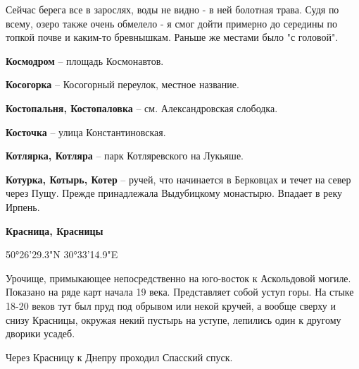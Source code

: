 Сейчас берега все в зарослях, воды не видно - в ней болотная трава. Судя по всему, озеро также очень обмелело - я смог дойти примерно до середины по топкой почве и каким-то бревнышкам. Раньше же местами было "с головой".\\

\medskip

\textbf{Космодром} – площадь Космонавтов.\\

\medskip

\textbf{Косогорка} – Косогорный переулок, местное название.\\

\medskip

\textbf{Костопальня, Костопаловка} – см.  Александровская слободка.\\

\medskip

\textbf{Косточка} – улица Константиновская.\\

\medskip



\textbf{Котлярка, Котляра} – парк Котляревского на Лукьяше.\\

\medskip

\textbf{Котурка, Котырь, Котер} – ручей, что начинается в Берковцах и течет на север через Пущу. Прежде принадлежала Выдубицкому монастырю. Впадает в реку Ирпень.\\

\medskip

\textbf{Красница, Красницы} 

50°26'29.3"N 30°33'14.9"E

Урочище, примыкающее непосредственно на юго-восток к Аскольдовой могиле. Показано на ряде карт начала 19 века. Представляет собой уступ горы. На стыке 18-20 веков тут был пруд под обрывом или некой кручей, а вообще сверху и снизу Красницы, окружая некий пустырь на уступе, лепились один к другому дворики усадеб.

Через Красницу к Днепру проходил Спасский спуск.\\

\medskip

